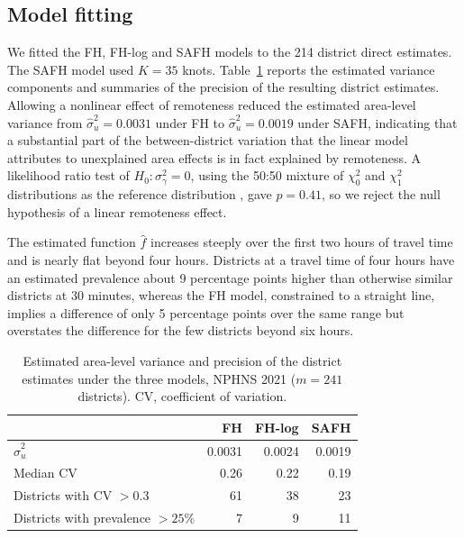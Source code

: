 \subsection{Model fitting}

We fitted the FH, FH-log and SAFH models to the 214 district direct estimates.
The SAFH model used $K = 35$ knots. Table~\ref{tab:app} reports the estimated
variance components and summaries of the precision of the resulting district
estimates. Allowing a nonlinear effect of remoteness reduced the estimated
area-level variance from $\hat\sigma_u^2 = 0.0031$ under FH to
$\hat\sigma_u^2 = 0.0019$ under SAFH, indicating that a substantial part of the
between-district variation that the linear model attributes to unexplained
area effects is in fact explained by remoteness. A likelihood ratio test of
$H_0\colon \sigma_\gamma^2 = 0$, using the 50:50 mixture of $\chi^2_0$ and
$\chi^2_1$ distributions as the reference distribution
\citep{crainiceanu2004likelihood}, gave $p = 0.41$, so we reject the null
hypothesis of a linear remoteness effect.

The estimated function $\hat f$ increases steeply over the first two hours of
travel time and is nearly flat beyond four hours. Districts at a travel time of
four hours have an estimated prevalence about 9 percentage points higher than
otherwise similar districts at 30 minutes, whereas the FH model, constrained to
a straight line, implies a difference of only 5 percentage points over the same
range but overstates the difference for the few districts beyond six hours.

\begin{table}[t]
\centering
\caption{Estimated area-level variance and precision of the district estimates
under the three models, NPHNS 2021 ($m = 241$ districts). CV, coefficient of
variation.}
\label{tab:app}
\begin{tabular}{lrrr}
\toprule
 & FH & FH-log & SAFH \\
\midrule
$\hat\sigma_u^2$                    & 0.0031 & 0.0024 & 0.0019 \\
Median CV                           & 0.26   & 0.22   & 0.19   \\
Districts with CV $> 0.3$           & 61     & 38     & 23     \\
Districts with prevalence $> 25\%$  & 7      & 9      & 11     \\
\bottomrule
\end{tabular}
\end{table}

